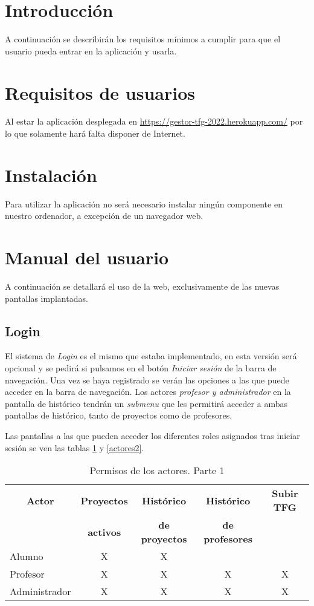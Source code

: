 
\section{Introducción}
A continuación se describirán los requisitos mínimos a cumplir para que el usuario pueda entrar en la aplicación y usarla.

\section{Requisitos de usuarios}
 Al estar la aplicación desplegada en \href{https://gestor-tfg-2022.herokuapp.com/}{https://gestor-tfg-2022.herokuapp.com/} por lo que solamente hará falta disponer de Internet.
\section{Instalación}
Para utilizar la aplicación no será necesario instalar ningún componente en nuestro ordenador, a excepción de un navegador web.
\section{Manual del usuario}
A continuación se detallará el uso de la web, exclusivamente de las nuevas pantallas implantadas.
\subsection{Login}
El sistema de \emph{Login} es el mismo que estaba implementado, en esta versión será opcional y se pedirá si pulsamos en el botón \emph{Iniciar sesión} de la barra de navegación. Una vez se haya registrado se verán las opciones a las que puede acceder en la barra de navegación. Los actores \emph{profesor y administrador} en la pantalla de histórico tendrán un \emph{submenu} que les permitirá acceder a ambas pantallas de histórico, tanto de proyectos como de profesores.

Las pantallas a las que pueden acceder los diferentes roles asignados tras iniciar sesión se ven las tablas
\ref{actores} y \ref{actores2}.
 
 \begin{table}[]
 	\label{actores}
 	\centering
 	\begin{tabular}{|l|c|c|c|c|}
 		\hline
 		\multicolumn{1}{|c|}{\textbf{Actor}}     & \textbf{Proyectos} & \textbf{Histórico} & \textbf{Histórico} & \textbf{Subir TFG} \\
 		\multicolumn{1}{|c|}{}     & \textbf{activos} & \textbf{de proyectos} & \textbf{de profesores} & {}  \\ \hline 
 		Alumno & X & X & {} & {} \\ \hline
 		Profesor  & X & X & X & X   \\ \hline
 		Administrador   & X & X & X & X   \\ \hline
 	\end{tabular}
 	\caption{Permisos de los actores. Parte 1}
 \end{table}

